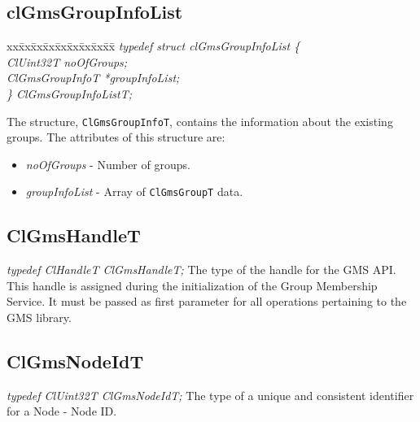 \begin{flushleft}
\subsection{clGmsGroupInfoList}
\begin{tabbing}
xx\=xx\=xx\=xx\=xx\=xx\=xx\=xx\=xx\=\kill
\textit{typedef struct clGmsGroupInfoList \{}\\
\>\>\>\>\textit{ClUint32T           noOfGroups;}\\
\>\>\>\>\textit{ClGmsGroupInfoT     *groupInfoList;}\\
\textit{\} ClGmsGroupInfoListT;}\end{tabbing}
The structure, {\tt{ClGmsGroupInfoT}}, contains the information about the existing groups. The attributes of this structure are:
\begin{itemize}
\item
\textit{noOfGroups} - Number of groups.
\item
\textit{groupInfoList} - Array of {\tt{ClGmsGroupT}} data.
\end{itemize}




\subsection{ClGmsHandleT}
\textit{typedef ClHandleT ClGmsHandleT;}
\newline
\newline
 The type of the handle for the GMS API. This handle is assigned during the initialization
 of the Group Membership Service.
 It must be passed as first parameter for all operations pertaining to the GMS library.



\subsection{ClGmsNodeIdT}
\textit{typedef ClUint32T ClGmsNodeIdT;}
\newline
\newline
The type of a unique and consistent identifier for a Node - Node ID.




\end{flushleft}
